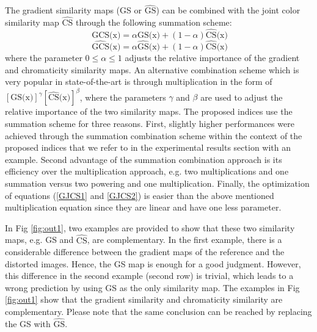 The gradient similarity maps (GS or $\widehat{\text{GS}}$) can be combined with the joint color similarity map $\widehat{\text{CS}}$ through the following summation scheme:       
\begin{equation}
  \ \text{GCS(x)}=\alpha \text{GS(x)} + (1-\alpha)\widehat{\text{CS}}\text{(x)}
  \label{GJCS1}
\end{equation} 
\begin{equation}
  \ \widehat{\text{GCS}}\text{(x)}=\alpha \widehat{\text{GS}}\text{(x)} + (1-\alpha)\widehat{\text{CS}}\text{(x)}
  \label{GJCS2}
\end{equation} 
where the parameter $0 \leq \alpha \leq 1$ adjusts the relative importance of the gradient and chromaticity similarity maps. An alternative combination scheme which is very popular in state-of-the-art is through multiplication in the form of $[\text{GS(x)}] ^ \gamma  [{\widehat{\text{CS}}\text{(x)}}] ^ \beta$, where the parameters $\gamma$ and $\beta$ are used to adjust the relative importance of the two similarity maps. The proposed indices use the summation scheme for three reasons. First, slightly higher performances were achieved through the summation combination scheme within the context of the proposed indices that we refer to in the experimental results section with an example. Second advantage of the summation combination approach is its efficiency over the multiplication approach, e.g. two multiplications and one summation versus two powering and one multiplication. Finally, the optimization of equations (\ref{GJCS1} and \ref{GJCS2}) is easier than the above mentioned multiplication equation since they are linear and have one less parameter.  
        


In Fig \ref{fig:out1}, two examples are provided to show that these two similarity maps, e.g. GS and $\widehat{\text{CS}}$, are complementary. In the first example, there is a considerable difference between the gradient maps of the reference and the distorted images. Hence, the GS map is enough for a good judgment. However, this difference in the second example (second row) is trivial, which leads to a wrong prediction by using GS as the only similarity map. The examples in Fig \ref{fig:out1} show that the gradient similarity and chromaticity similarity are complementary. Please note that the same conclusion can be reached by replacing the GS with $\widehat{\text{GS}}$.       





